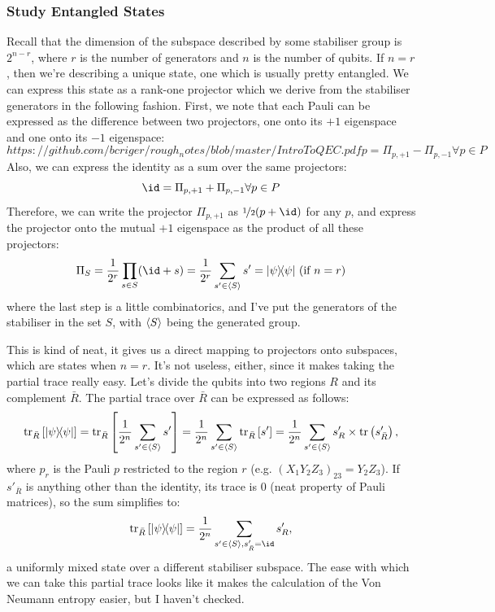 \documentclass[10pt,a4paper, english]{scrartcl}
\begin{document}
\subsubsection{Study Entangled States}
Recall that the dimension of the subspace described by some stabiliser group is $2^{n-r}$, where $r$ is the number of generators and $n$ is the number of qubits. 
If $n=r$, then we're describing a unique state, one which is usually pretty entangled. 
We can express this state as a rank-one projector which we derive from the stabiliser generators in the following fashion. 
First, we note that each Pauli can be expressed as the difference between two projectors, one onto its $+1$ eigenspace and one onto its $-1$ eigenspace:
\begin{equation}https://github.com/bcriger/rough_notes/blob/master/IntroToQEC.pdf
p = \Pi_{p,+1} - \Pi_{p,-1} \forall p \in P 
\end{equation}
Also, we can express the identity as a sum over the same projectors:
\begin{equation}
\id = \Pi_{p,+1} + \Pi_{p,-1} \forall p \in P 
\end{equation}
Therefore, we can write the projector $\Pi_{p,+1}$ as $\nicefrac{1}{2}(p + \id)$ for any $p$, and express the projector onto the mutual $+1$ eigenspace as the product of all these projectors:
\begin{equation}
\Pi_S = \frac{1}{2^r}\prod_{s \in S} (\id + s) = \frac{1}{2^r}\sum_{s' \in \group{S}} s' = \proj{\psi} \textrm{ (if $n=r$)}
\end{equation}
where the last step is a little combinatorics, and I've put the generators of the stabiliser in the set $S$, with $\left \langle S \right \rangle$ being the generated group. 

This is kind of neat, it gives us a direct mapping to projectors onto subspaces, which are states when $n=r$. 
It's not useless, either, since it makes taking the partial trace really easy. 
Let's divide the qubits into two regions $R$ and its complement $\bar{R}$.
The partial trace over $\bar{R}$ can be expressed as follows:
\begin{equation}
\mathrm{tr}_{\bar{R}} \left[ {\left\vert{\psi}\right\rangle} \! {\left\langle{\psi}\right\vert} \right] = \mathrm{tr}_{\bar{R}} \left[ \frac{1}{2^n}\sum_{s' \in \left \langle S \right \rangle} s' \right] = \frac{1}{2^n} \sum_{s' \in \left \langle S \right \rangle} \mathrm{tr}_{\bar{R}} \left[ s' \right] = \frac{1}{2^n} \sum_{s' \in \left \langle S \right \rangle} s'_R \times \mathrm{tr} \left( s'_{\bar{R}} \right),
\end{equation}
where $p_r$ is the Pauli $p$ restricted to the region $r$ (e.g. $(X_1 Y_2 Z_3)_{23} = Y_2 Z_3$). 
If $s'_{\bar{R}}$ is anything other than the identity, its trace is 0 (neat property of Pauli matrices), so the sum simplifies to:
\begin{equation}
\tr_{\bar{R}} \left[ \proj{\psi} \right] = \frac{1}{2^n} \sum_{s' \in \group{S}, s'_{\bar{R}}=\id } s'_R, 
\end{equation}
a uniformly mixed state over a different stabiliser subspace. 
The ease with which we can take this partial trace looks like it makes the calculation of the Von Neumann entropy easier, but I haven't checked.
\end{document}
